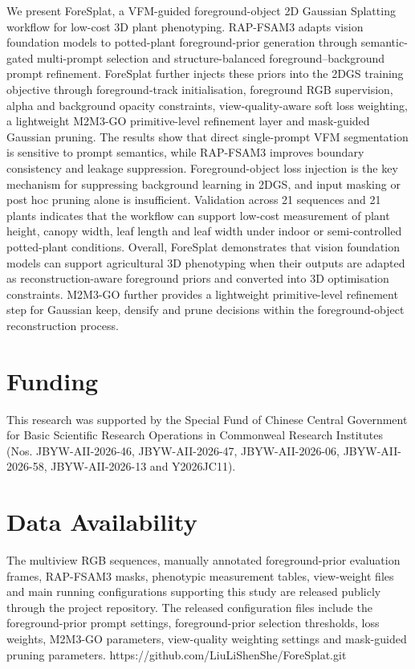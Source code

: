 \documentclass[a4paper]{cas-sc}
\begin{document}
We present ForeSplat, a VFM-guided foreground-object 2D Gaussian Splatting workflow for low-cost 3D plant phenotyping. RAP-FSAM3 adapts vision foundation models to potted-plant foreground-prior generation through semantic-gated multi-prompt selection and structure-balanced foreground--background prompt refinement. ForeSplat further injects these priors into the 2DGS training objective through foreground-track initialisation, foreground RGB supervision, alpha and background opacity constraints, view-quality-aware soft loss weighting, a lightweight M2M3-GO primitive-level refinement layer and mask-guided Gaussian pruning. The results show that direct single-prompt VFM segmentation is sensitive to prompt semantics, while RAP-FSAM3 improves boundary consistency and leakage suppression. Foreground-object loss injection is the key mechanism for suppressing background learning in 2DGS, and input masking or post hoc pruning alone is insufficient. Validation across 21 sequences and 21 plants indicates that the workflow can support low-cost measurement of plant height, canopy width, leaf length and leaf width under indoor or semi-controlled potted-plant conditions. Overall, ForeSplat demonstrates that vision foundation models can support agricultural 3D phenotyping when their outputs are adapted as reconstruction-aware foreground priors and converted into 3D optimisation constraints. M2M3-GO further provides a lightweight primitive-level refinement step for Gaussian keep, densify and prune decisions within the foreground-object reconstruction process.

\section*{Funding}

This research was supported by the Special Fund of Chinese Central Government for Basic Scientific Research Operations in Commonweal Research Institutes (Nos. JBYW-AII-2026-46, JBYW-AII-2026-47, JBYW-AII-2026-06, JBYW-AII-2026-58, JBYW-AII-2026-13 and Y2026JC11).

\section*{Data Availability}

The multiview RGB sequences, manually annotated foreground-prior evaluation frames, RAP-FSAM3 masks, phenotypic measurement tables, view-weight files and main running configurations supporting this study are released publicly through the project repository. The released configuration files include the foreground-prior prompt settings, foreground-prior selection thresholds, loss weights, M2M3-GO parameters, view-quality weighting settings and mask-guided pruning parameters.
https://github.com/LiuLiShenShe/ForeSplat.git
\end{document}
